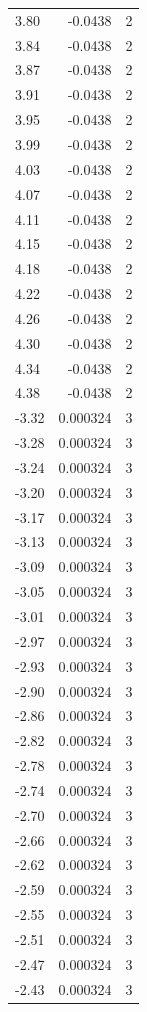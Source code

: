 \begin{longtable}{lrr}
  3.80 & -0.0438 & 2 \\
  3.84 & -0.0438 & 2 \\
  3.87 & -0.0438 & 2 \\
  3.91 & -0.0438 & 2 \\
  3.95 & -0.0438 & 2 \\
  3.99 & -0.0438 & 2 \\
  4.03 & -0.0438 & 2 \\
  4.07 & -0.0438 & 2 \\
  4.11 & -0.0438 & 2 \\
  4.15 & -0.0438 & 2 \\
  4.18 & -0.0438 & 2 \\
  4.22 & -0.0438 & 2 \\
  4.26 & -0.0438 & 2 \\
  4.30 & -0.0438 & 2 \\
  4.34 & -0.0438 & 2 \\
  4.38 & -0.0438 & 2 \\
  -3.32 & 0.000324 & 3 \\
  -3.28 & 0.000324 & 3 \\
  -3.24 & 0.000324 & 3 \\
  -3.20 & 0.000324 & 3 \\
  -3.17 & 0.000324 & 3 \\
  -3.13 & 0.000324 & 3 \\
  -3.09 & 0.000324 & 3 \\
  -3.05 & 0.000324 & 3 \\
  -3.01 & 0.000324 & 3 \\
  -2.97 & 0.000324 & 3 \\
  -2.93 & 0.000324 & 3 \\
  -2.90 & 0.000324 & 3 \\
  -2.86 & 0.000324 & 3 \\
  -2.82 & 0.000324 & 3 \\
  -2.78 & 0.000324 & 3 \\
  -2.74 & 0.000324 & 3 \\
  -2.70 & 0.000324 & 3 \\
  -2.66 & 0.000324 & 3 \\
  -2.62 & 0.000324 & 3 \\
  -2.59 & 0.000324 & 3 \\
  -2.55 & 0.000324 & 3 \\
  -2.51 & 0.000324 & 3 \\
  -2.47 & 0.000324 & 3 \\
  -2.43 & 0.000324 & 3 \\

\end{longtable}
